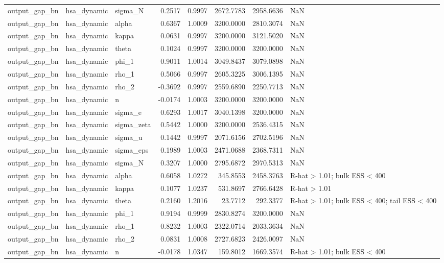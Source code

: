 \begin{tabular}{lllrrrrl}
output\_gap\_bn & hsa\_dynamic & sigma\_N & 0.2517 & 0.9997 & 2672.7783 & 2958.6636 & NaN \\
output\_gap\_bn & hsa\_dynamic & alpha & 0.6367 & 1.0009 & 3200.0000 & 2810.3074 & NaN \\
output\_gap\_bn & hsa\_dynamic & kappa & 0.0631 & 0.9997 & 3200.0000 & 3121.5020 & NaN \\
output\_gap\_bn & hsa\_dynamic & theta & 0.1024 & 0.9997 & 3200.0000 & 3200.0000 & NaN \\
output\_gap\_bn & hsa\_dynamic & phi\_1 & 0.9011 & 1.0014 & 3049.8437 & 3079.0898 & NaN \\
output\_gap\_bn & hsa\_dynamic & rho\_1 & 0.5066 & 0.9997 & 2605.3225 & 3006.1395 & NaN \\
output\_gap\_bn & hsa\_dynamic & rho\_2 & -0.3692 & 0.9997 & 2559.6890 & 2250.7713 & NaN \\
output\_gap\_bn & hsa\_dynamic & n & -0.0174 & 1.0003 & 3200.0000 & 3200.0000 & NaN \\
output\_gap\_bn & hsa\_dynamic & sigma\_e & 0.6293 & 1.0017 & 3040.1398 & 3200.0000 & NaN \\
output\_gap\_bn & hsa\_dynamic & sigma\_zeta & 0.5442 & 1.0000 & 3200.0000 & 2536.4315 & NaN \\
output\_gap\_bn & hsa\_dynamic & sigma\_u & 0.1442 & 0.9997 & 2071.6156 & 2702.5196 & NaN \\
output\_gap\_bn & hsa\_dynamic & sigma\_eps & 0.1989 & 1.0003 & 2471.0688 & 2368.7311 & NaN \\
output\_gap\_bn & hsa\_dynamic & sigma\_N & 0.3207 & 1.0000 & 2795.6872 & 2970.5313 & NaN \\
output\_gap\_bn & hsa\_dynamic & alpha & 0.6058 & 1.0272 & 345.8553 & 2458.3763 & R-hat > 1.01; bulk ESS < 400 \\
output\_gap\_bn & hsa\_dynamic & kappa & 0.1077 & 1.0237 & 531.8697 & 2766.6428 & R-hat > 1.01 \\
output\_gap\_bn & hsa\_dynamic & theta & 0.2160 & 1.2016 & 23.7712 & 292.3377 & R-hat > 1.01; bulk ESS < 400; tail ESS < 400 \\
output\_gap\_bn & hsa\_dynamic & phi\_1 & 0.9194 & 0.9999 & 2830.8274 & 3200.0000 & NaN \\
output\_gap\_bn & hsa\_dynamic & rho\_1 & 0.8232 & 1.0003 & 2322.0714 & 2033.3634 & NaN \\
output\_gap\_bn & hsa\_dynamic & rho\_2 & 0.0831 & 1.0008 & 2727.6823 & 2426.0097 & NaN \\
output\_gap\_bn & hsa\_dynamic & n & -0.0178 & 1.0347 & 159.8012 & 1669.3574 & R-hat > 1.01; bulk ESS < 400 \\

\end{tabular}

